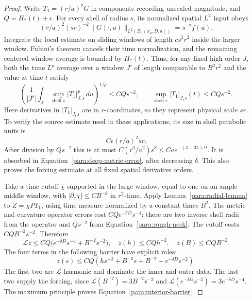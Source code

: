 \begin{proof}
Write $T_1=(r/a)^2G$ in components recording unscaled magnitude,
and $Q=H_*(t)+\epsilon$.  For every shell of radius $s$, its
normalized spatial $L^2$ input obeys
\begin{equation}
 (r/a)^2(sr)^{-2}\|G(\cdot,u)\|_{L^2(B_u(x_u,D_1a))}
       =s^{-2}f(u).
 \label{para:interior-normalization}
\end{equation}
Integrate the local estimate on sliding windows of length $c s^2r^2$
inside the larger window.  Fubini's theorem cancels their time
normalization, and the remaining centered window average is bounded
by $H_*(t)$.  Thus, for any fixed high order $J$, both the time
$L^p$ average over a window $J'$ of length comparable to $B^2r^2$ and
the value at time $t$ satisfy
\begin{equation}
 \left(\frac1{|J'|}\int_{J'}\sup_{\text{shell }s}|T_1|_{J,s}^p\,du\right)^{1/p}
      \le CQs^{-2},\qquad
 \sup_{\text{shell }s}|T_1|_{J,s}(t)\le CQs^{-2}.
 \label{para:rough-neck}
\end{equation}
Here derivatives in $|T_1|_{J,s}$ are in $r$-coordinates, so they
represent physical scale $sr$.  To verify the source estimate used
in these applications, its size in shell parabolic units is
\[
 C\epsilon(r/a)^2sr.
\]
After division by $Qs^{-2}$ this is at most
$C(r^3/a^2)s^3\le Ca e^{-(3-3\lambda)D}$.
It is absorbed in Equation~\eqref{para:deep-metric-error}, after
decreasing $\delta$.  This also proves the forcing estimate at
all fixed spatial derivative orders.

Take a time cutoff $\chi$ supported in the large window, equal to
one on an ample middle window, with
$|\partial_\tau\chi|\le CB^{-2}$ in $r^2$-time.  Apply
Lemma~\ref{para:radial-lemma} to $Z=\chi PT_1$, using time measure
normalized by a constant times $B^2$.  The metric and curvature
operator errors cost $CQe^{-\delta D}s^{-4}$: there are two
inverse shell radii from the operator and $Qs^{-2}$ from
Equation~\eqref{para:rough-neck}.  The cutoff costs
$CQB^{-2}s^{-2}$.  Therefore
\[
 \mathcal Lz\le CQ\bigl(e^{-\delta D}s^{-4}+B^{-2}s^{-2}\bigr),\quad
 z(h)\le CQh^{-2},\quad z(B)\le CQB^{-2}.
\]
The four terms in the following barrier have explicit roles:
\begin{equation}
 z(s)\le CQ\left(hs^{-3}+B^{-3}s+B^{-2}
                                  +e^{-\delta D}s^{-2}\right).
 \label{para:interior-barrier}
\end{equation}
The first two are $\mathcal L$-harmonic and dominate the inner and
outer data.  The last two supply the forcing, since
$\mathcal L(B^{-2})=3B^{-2}s^{-2}$ and
$\mathcal L(e^{-\delta D}s^{-2})=3e^{-\delta D}s^{-4}$.
The maximum principle proves Equation~\eqref{para:interior-barrier}.


\end{proof}
